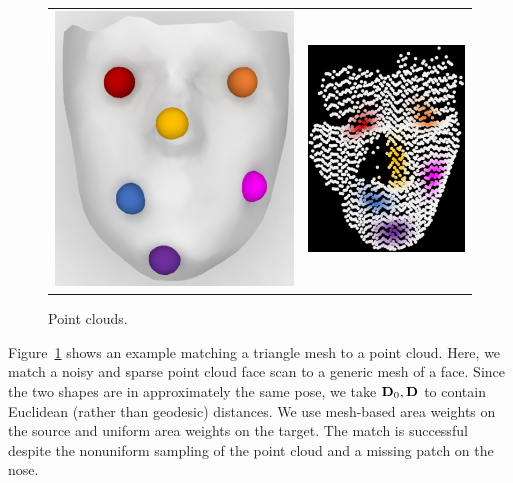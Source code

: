 \setlength{\columnsep}{2pt}
\begin{figure}\centering
\vspace{-.15in}
\begin{tabular}{c@{}c}
\includegraphics[height=.6\linewidth]{figures/cloud/source_cloud.pdf}&
\includegraphics[height=.6\linewidth]{figures/cloud/cloud.pdf}
\end{tabular}
\vspace{-.15in}
\caption{Point clouds.}\label{fig:clouds}
\end{figure}
Figure~\ref{fig:clouds} shows an example matching a triangle mesh to a point cloud.  Here, we match a noisy and sparse point cloud face scan to a generic mesh of a face. Since the two shapes are in approximately the same pose, we take $\mathbf D_0, \mathbf D$ to contain Euclidean (rather than geodesic) distances.  We use mesh-based area weights on the source and uniform area weights on the target.  The match is successful despite the nonuniform sampling of the point cloud and a missing patch on the nose.


